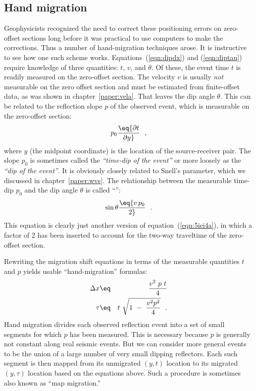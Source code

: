 \subsection{Hand migration}
\par
Geophysicists recognized the need to correct these positioning errors
on zero-offset sections long before it was practical to use computers
to make the corrections.
Thus a number of hand-migration techniques arose.
It is instructive to see how one such scheme works.  
Equations~(\ref{eqn:dipdx}) and (\ref{eqn:diptau}) require knowledge of three quantities:
$t$, $v$, and $\theta$.
Of these, the event time $t$ is readily measured on the zero-offset section.
The velocity $v$ is usually {\em not} measurable on the zero offset section
and must be estimated from finite-offset data,
as was shown in chapter~\ref{paper:vela}.
That leaves the dip angle $\theta$.
This can be related to the reflection slope $p$ of the observed event,
which is measurable on the zero-offset section: 
\begin{equation}
p_0 \eq {\partial t \over \partial y}  \ \ ,
\label{eqn:pdefn}
\end{equation}
where $y$ (the midpoint coordinate) is the location of the 
source-receiver pair.
The slope $p_0$ is sometimes called the {\em ``time-dip of the event''} or 
more loosely 
as the {\em ``dip of the event''}.
It is obviously closely related to Snell's parameter,
which we discussed in chapter~\ref{paper:wvs}.   
The relationship between the measurable time-dip $p_0$ 
and the dip angle $\theta$ is called
``'':
\begin{equation}
\sin\theta \eq {v\,p_0 \over 2}   \ \ .
\label{eqn:tuchel}
\end{equation}
This equation is clearly just another version
of equation~(\ref{eqn:5iei4a}),
in which a factor of $2$ has been inserted to account for the 
two-way traveltime
of the zero-offset section.

%

\par
Rewriting the migration shift equations in terms of the measurable
quantities $t$ and $p$ yields usable ``hand-migration'' formulas:
\begin{eqnarray}
\Delta x &\eq& {v^2\ p\ t \over 4}
\label{eqn:laydxp}
\\
\tau &\eq& t\ \sqrt{1\ -\ {v^2 p^2 \over 4} }  \ \  .
\label{eqn:laytaup}
\end{eqnarray}
Hand migration divides each observed reflection event
into a set of small segments for which $p$ has been measured.
This is necessary because $p$ is generally 
not constant along real seismic events.
But we can consider more general
events to be the union of a large number of very small dipping reflectors.
Each such segment is then mapped from its unmigrated $(y,t)$ location
to its migrated $(y,\tau)$ location based on the equations above.  
Such a procedure is sometimes also known as ``map migration.''  

